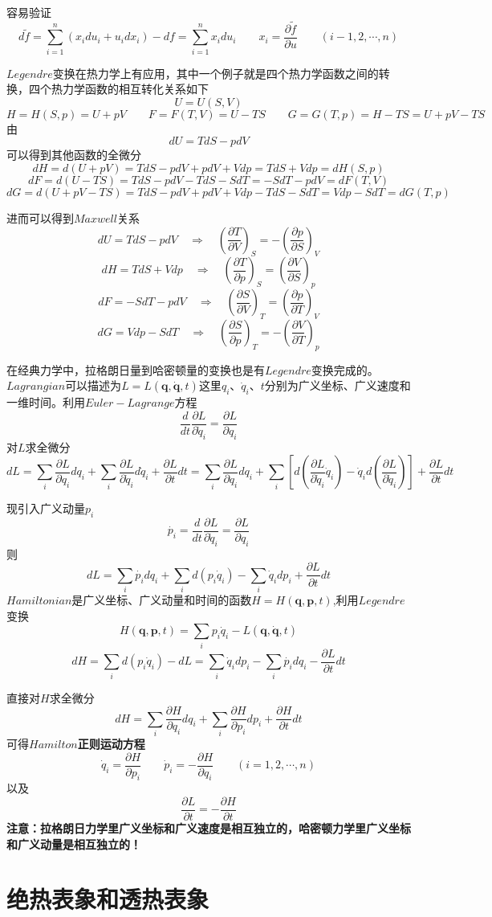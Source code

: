 容易验证
\[d\tilde{f}=\sum_{i=1}^n(x_idu_i+u_idx_i)-df=\sum_{i=1}^nx_idu_i \qquad x_i=\frac{\partial \tilde{f}}{\partial u} \qquad (i-1,2,\cdots,n)\]

$Legendre$变换在热力学上有应用，其中一个例子就是四个热力学函数之间的转换，四个热力学函数的相互转化关系如下
\[U=U(S,V)\]
\[H=H(S,p)=U+pV \qquad F=F(T,V)=U-TS \qquad G=G(T,p)=H-TS=U+pV-TS\]
由
\[dU=TdS-pdV\]
可以得到其他函数的全微分
\[dH=d(U+pV)=TdS-pdV+pdV+Vdp=TdS+Vdp=dH(S,p)\]
\[dF=d(U-TS)=TdS-pdV-TdS-SdT=-SdT-pdV=dF(T,V)\]
\[dG=d(U+pV-TS)=TdS-pdV+pdV+Vdp-TdS-SdT=Vdp-SdT=dG(T,p)\]

进而可以得到$Maxwell$关系
\[dU=TdS-pdV \quad \Rightarrow \quad \left(\frac{\partial T}{\partial V}\right)_S=-\left(\frac{\partial p}{\partial S}\right)_V\]
\[dH=TdS+Vdp \quad \Rightarrow \quad \left(\frac{\partial T}{\partial p}\right)_S=\left(\frac{\partial V}{\partial S}\right)_p\]
\[dF=-SdT-pdV \quad \Rightarrow \quad \left(\frac{\partial S}{\partial V}\right)_T=\left(\frac{\partial p}{\partial T}\right)_V\]
\[dG=Vdp-SdT \quad \Rightarrow \quad \left(\frac{\partial S}{\partial p}\right)_T=-\left(\frac{\partial V}{\partial T}\right)_p\]

在经典力学中，拉格朗日量到哈密顿量的变换也是有$Legendre$变换完成的。
$Lagrangian$可以描述为$L=L(\mathbf{q},\dot{\mathbf{q}},t)$这里$q_i$、$\dot{q}_i$、$t$分别为广义坐标、广义速度和一维时间。利用$Euler-Lagrange$方程
\[\frac{d}{dt}\frac{\partial L}{\partial \dot{q}_i}=\frac{\partial L}{\partial q_i}\]
对$L$求全微分
\[dL=\sum_i\frac{\partial L}{\partial q_i}dq_i+\sum_i\frac{\partial L}{\partial \dot{q}_i}d\dot{q}_i+\frac{\partial L}{\partial t}dt
=\sum_i\frac{\partial L}{\partial q_i}dq_i+\sum_i\left[d\left(\frac{\partial L}{\partial \dot{q}_i}\dot{q}_i\right)-\dot{q}_id\left(\frac{\partial L}{\partial \dot{q}_i}\right)\right]+\frac{\partial L}{\partial t}dt\]

现引入广义动量$p_i$
\[\dot{p_i}=\frac{d}{dt}\frac{\partial L}{\partial \dot{q}_i}=\frac{\partial L}{\partial q_i}\]
则
\[dL=\sum_i\dot{p_i}dq_i+\sum_id\left(p_i\dot{q}_i\right)-\sum_i\dot{q}_idp_i+\frac{\partial L}{\partial t}dt\]
$Hamiltonian$是广义坐标、广义动量和时间的函数$H=H(\mathbf{q},\mathbf{p},t)$,利用$Legendre$变换
\[H(\mathbf{q},\mathbf{p},t)=\sum_ip_i\dot{q}_i-L(\mathbf{q},\dot{\mathbf{q}},t)\]
\[dH=\sum_id\left(p_i\dot{q}_i\right)-dL=\sum_i\dot{q}_idp_i-\sum_i\dot{p_i}dq_i-\frac{\partial L}{\partial t}dt\]

直接对$H$求全微分
\[dH=\sum_i\frac{\partial H}{\partial q_i}dq_i+\sum_i\frac{\partial H}{\partial p_i}dp_i+\frac{\partial H}{\partial t}dt\]
可得\textbf{$Hamilton$正则运动方程}
\[\dot{q}_i=\frac{\partial H}{\partial p_i} \qquad \dot{p}_i=-\frac{\partial H}{\partial q_i} \qquad (i=1,2,\cdots,n)\]
以及
\[\frac{\partial L}{\partial t}=-\frac{\partial H}{\partial t}\]
\textbf{注意：拉格朗日力学里广义坐标和广义速度是相互独立的，哈密顿力学里广义坐标和广义动量是相互独立的！}

\section{绝热表象和透热表象}